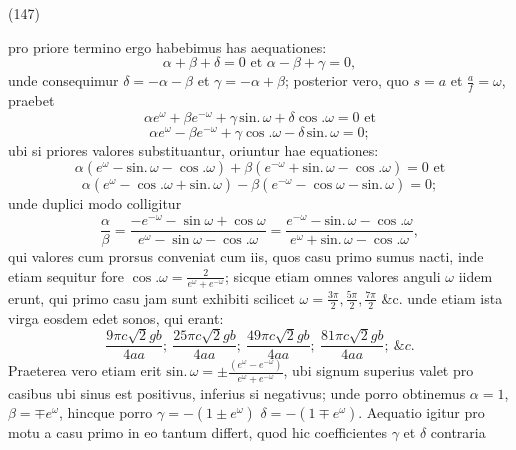 \documentclass[11pt,a4paper]{article}
\begin{document}
(147)

pro priore termino ergo habebimus has aequationes:
\[ \alpha+\beta+\delta=0 \text{ et } \alpha-\beta+\gamma=0, \]
unde consequimur $\delta=-\alpha-\beta$ et $\gamma=-\alpha+\beta$; posterior vero, quo $s=a$
et $\frac{a}{f}=\omega$, praebet
\[ \alpha e^{\omega}+\beta e^{-\omega}+\gamma\,\text{sin.}\,\omega+\delta\cos.\omega=0 \text{ et} \]
\[ \alpha e^{\omega}-\beta e^{-\omega}+\gamma\cos.\omega-\delta\,\text{sin.}\,\omega=0; \]
ubi si priores valores substituantur, oriuntur hae equationes:
\[ \alpha(e^{\omega}-\text{sin.}\,\omega-\cos.\omega)+\beta(e^{-\omega}+\text{sin.}\,\omega-\cos.\omega)=0 \text{ et} \]
\[ \alpha(e^{\omega}-\cos.\omega+\text{sin.}\,\omega)-\beta(e^{-\omega}-\cos\omega-\text{sin.}\,\omega)=0; \]
unde duplici modo colligitur
\[ \frac{\alpha}{\beta}=\frac{-e^{-\omega}-\sin\omega+\cos\omega}{e^{\omega}-\sin\omega-\cos.\omega}=\frac{e^{-\omega}-\text{sin.}\,\omega-\cos.\omega}{e^{\omega}+\text{sin.}\,\omega-\cos.\omega}, \]
qui valores cum prorsus conveniat cum iis, quos casu primo
sumus nacti, inde etiam sequitur fore $\cos.\omega=\frac{2}{e^{\omega}+e^{-\omega}}$; sicque
etiam omnes valores anguli $\omega$ iidem erunt, qui primo casu
jam sunt exhibiti scilicet $\omega=\frac{3\pi}{2}, \frac{5\pi}{2}, \frac{7\pi}{2}$ \&c. unde etiam
ista virga eosdem edet sonos, qui erant:
\[ \frac{9\pi c\surd 2gb}{4aa};\ \frac{25\pi c\surd 2gb}{4aa};\ \frac{49\pi c\surd 2gb}{4aa};\ \frac{81\pi c\surd 2gb}{4aa};\ \&c. \]
 Praeterea vero etiam erit $\text{sin.}\,\omega=\pm\frac{(e^{\omega}-e^{-\omega})}{e^{\omega}+e^{-\omega}}$, ubi
signum superius valet pro casibus ubi sinus est positivus,
inferius si negativus; unde porro obtinemus $\alpha=1$, $\beta=\mp e^{\omega}$, hincque
porro $\gamma=-(1\pm e^{\omega})$  $\delta=-(1\mp e^{\omega})$. Aequatio igitur pro motu a casu
primo in eo tantum differt, quod hic coefficientes $\gamma$ et $\delta$ contraria
\end{document}
